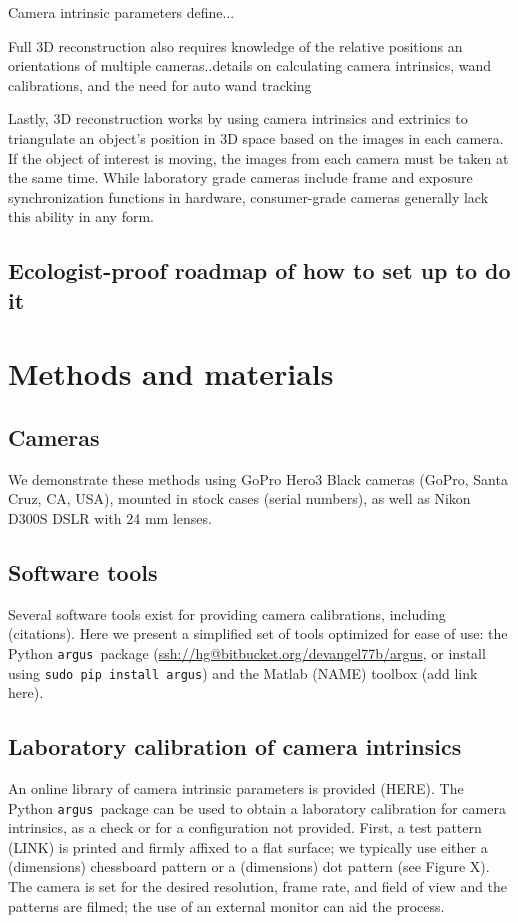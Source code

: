 \documentclass[fleqn,10pt]{wlpeerj}
\makeatletter
\newcommand{\argus}{\texttt{argus}}
\newcommand{\pipcommand}{\texttt{sudo pip install argus}}
\newcommand{\argusrepo}{\url{ssh://hg@bitbucket.org/devangel77b/argus}}
\newcommand{\matlabtoolbox}{add link here}
\makeatother
\begin{document}
Camera intrinsic parameters define...

Full 3D reconstruction also requires knowledge of the relative positions an orientations of multiple cameras..details on calculating camera intrinsics, wand calibrations, and the need for auto wand tracking

Lastly, 3D reconstruction works by using camera intrinsics and extrinics to triangulate an object's position in 3D space based on the images in each camera.  If the object of interest is moving, the images from each camera must be taken at the same time. While laboratory grade cameras include frame and exposure synchronization functions in hardware, consumer-grade cameras generally lack this ability in any form.  
\subsection*{Ecologist-proof roadmap of how to set up to do it}

\section*{Methods and materials}
\subsection*{Cameras}
We demonstrate these methods using GoPro Hero3 Black cameras (GoPro, Santa Cruz, CA, USA), mounted in stock cases (serial numbers), as well as Nikon D300S DSLR with 24 mm lenses. 

\subsection*{Software tools}
Several software tools exist for providing camera calibrations, including (citations).  Here we present a simplified set of tools optimized for ease of use: the Python \argus\ package (\argusrepo, or install using \pipcommand) and the Matlab (NAME) toolbox (\matlabtoolbox). %

\subsection*{Laboratory calibration of camera intrinsics}
An online library of camera intrinsic parameters is provided (HERE).  The Python \argus\ package can be used to obtain a laboratory calibration for camera intrinsics, as a check or for a configuration not provided. First, a test pattern (LINK) is printed and firmly affixed to a flat surface; we typically use either a (dimensions) chessboard pattern or a (dimensions) dot pattern (see Figure X).  The camera is set for the desired resolution, frame rate, and field of view and the patterns are filmed; the use of an external monitor can aid the process.  
\end{document}

